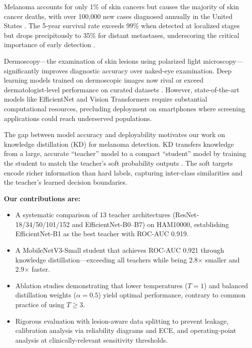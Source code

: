 \documentclass[conference]{IEEEtran}
\begin{document}
Melanoma accounts for only 1\% of skin cancers but causes the majority of skin cancer deaths, with over 100,000 new cases diagnosed annually in the United States \cite{siegel2023cancer}. The 5-year survival rate exceeds 99\% when detected at localized stages but drops precipitously to 35\% for distant metastases, underscoring the critical importance of early detection \cite{american_cancer_society_2024}.

Dermoscopy---the examination of skin lesions using polarized light microscopy---significantly improves diagnostic accuracy over naked-eye examination. Deep learning models trained on dermoscopic images now rival or exceed dermatologist-level performance on curated datasets \cite{esteva2017dermatologist,haenssle2018man}. However, state-of-the-art models like EfficientNet and Vision Transformers require substantial computational resources, precluding deployment on smartphones where screening applications could reach underserved populations.

The gap between model accuracy and deployability motivates our work on knowledge distillation (KD) for melanoma detection. KD transfers knowledge from a large, accurate ``teacher'' model to a compact ``student'' model by training the student to match the teacher's soft probability outputs \cite{hinton2015distilling}. The soft targets encode richer information than hard labels, capturing inter-class similarities and the teacher's learned decision boundaries.

\textbf{Our contributions are:}
\begin{itemize}
    \item A systematic comparison of 13 teacher architectures (ResNet-18/34/50/101/152 and EfficientNet-B0--B7) on HAM10000, establishing EfficientNet-B1 as the best teacher with ROC-AUC 0.919.
    
    \item A MobileNetV3-Small student that achieves ROC-AUC 0.921 through knowledge distillation---exceeding all teachers while being 2.8$\times$ smaller and 2.9$\times$ faster.
    
    \item Ablation studies demonstrating that lower temperatures ($T=1$) and balanced distillation weights ($\alpha=0.5$) yield optimal performance, contrary to common practice of using $T \geq 3$.
    
    \item Rigorous evaluation with lesion-aware data splitting to prevent leakage, calibration analysis via reliability diagrams and ECE, and operating-point analysis at clinically-relevant sensitivity thresholds.
\end{itemize}
\end{document}
